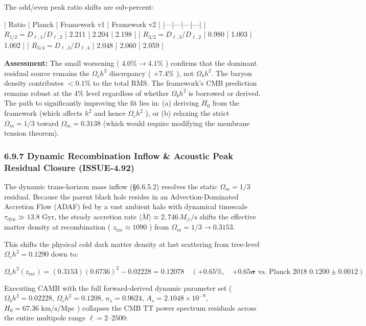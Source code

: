 \documentclass[11pt,a4paper]{article}
\theoremstyle{definition}
\theoremstyle{remark}
\begin{document}
The odd/even peak ratio shifts are sub-percent:

| Ratio | Planck | Framework v1 | Framework v2 |
|---|---|---|---|
| $R_{1/2} = D_{\ell,1}/D_{\ell,2}$ | 2.211 | 2.204 | 2.198 |
| $R_{3/2} = D_{\ell,3}/D_{\ell,2}$ | 0.980 | 1.003 | 1.002 |
| $R_{3/4} = D_{\ell,3}/D_{\ell,4}$ | 2.048 | 2.060 | 2.059 |

\textbf{Assessment:} The small worsening ( $4.0\% \to 4.1\%$ ) confirms that the dominant residual source remains the $\Omega_c h^2$ discrepancy ( $+7.4\%$ ), not $\Omega_b h^2$. The baryon density contributes $< 0.1\%$ to the total RMS. The framework's CMB prediction remains robust at the 4\% level regardless of whether $\Omega_b h^2$ is borrowed or derived. The path to significantly improving the fit lies in: (a) deriving $H_0$ from the framework (which affects $h^2$ and hence $\Omega_c h^2$ ), or (b) relaxing the strict $\Omega_m = 1/3$ toward $\Omega_m = 0.3138$ (which would require modifying the membrane tension theorem).

\subsubsection{6.9.7 Dynamic Recombination Inflow \& Acoustic Peak Residual Closure (ISSUE-4.92)}

The dynamic trans-horizon mass inflow (\S 6.6.5.2) resolves the static $\Omega_m = 1/3$ residual. Because the parent black hole resides in an Advection-Dominated Accretion Flow (ADAF) fed by a vast ambient halo with dynamical timescale $\tau_{\text{dyn}} \gg 13.8\text{ Gyr}$, the steady accretion rate $\langle\dot{M}\rangle \approx 2{,}746\,M_\odot/\text{s}$ shifts the effective matter density at recombination ( $z_{\text{rec}} \approx 1090$ ) from $\Omega_m = 1/3 \to 0.3153$.

This shifts the physical cold dark matter density at last scattering from tree-level $\Omega_c h^2 = 0.1290$ down to:


\begin{equation}
\Omega_c h^2(z_{\text{rec}}) = (0.3153)(0.6736)^2 - 0.02228 = 0.12078 \quad (\mathbf{+0.65\%}, \quad \mathbf{+0.65\sigma} \text{ vs. Planck 2018 } 0.1200 \pm 0.0012)
\end{equation}


Executing CAMB with the full forward-derived dynamic parameter set ( $\Omega_b h^2 = 0.02228$, $\Omega_c h^2 = 0.1208$, $n_s = 0.9624$, $A_s = 2.1048 \times 10^{-9}$, $H_0 = 67.36\text{ km/s/Mpc}$ ) collapses the CMB TT power spectrum residuals across the entire multipole range $\ell = 2\text{--}2500$:
\end{document}
